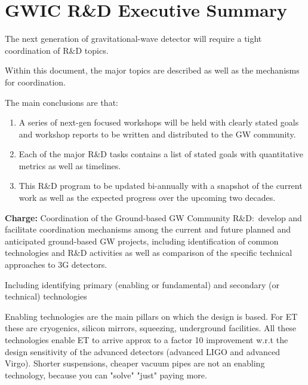 \chapter{GWIC R\&D Executive Summary}
\label{sec:Exec}

The next generation of gravitational-wave detector will require a tight coordination of R\&D topics.

Within this document, the major topics are described as well as the mechanisms for coordination.

The main conclusions are that:
\begin{enumerate}
\item A series of next-gen focused workshops will be held with clearly stated goals and workshop reports to be written and distributed to the GW community.

\item Each of the major R\&D tasks contains a list of stated goals with quantitative metrics as well as timelines.

\item This R\&D program to be updated bi-annually with a snapshot of the current work as well as the expected progress over the upcoming two decades. 
\end{enumerate}

\textbf{Charge:} Coordination of the Ground-based GW Community R\&D:~develop and facilitate coordination mechanisms among the current and future planned and anticipated ground-based GW projects, including identification of common technologies and R\&D activities as well as comparison of the specific technical approaches to 3G detectors.

Including identifying primary (enabling or fundamental) and secondary (or technical) technologies \\


\noindent 

\noindent Enabling technologies are the main pillars on which the design is based. For ET these are cryogenics, silicon mirrors, squeezing, underground facilities. All these technologies enable ET to arrive approx to a factor 10 improvement w.r.t the design sensitivity of the advanced detectors (advanced LIGO and advanced Virgo). Shorter suspensions, cheaper vacuum pipes are not an enabling technology, because you can "solve" "just" paying more.\\

